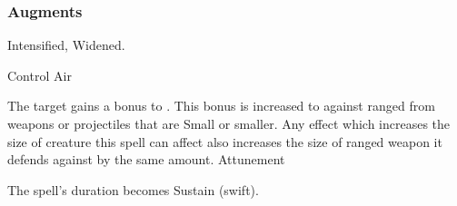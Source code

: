 \subsubsection{Augments}
 Intensified, Widened.
\begin{spellsection}{Control Air}
\begin{spellheader}
\end{spellheader}
\begin{spellcontent}
\begin{spelltargetinginfo}
\end{spelltargetinginfo}
\begin{spelleffects}
\spelleffect
The target gains a  bonus to .
This bonus is increased to  against ranged  from weapons or projectiles that are Small or smaller.
Any effect which increases the size of creature this spell can affect also increases the size of ranged weapon it defends against by the same amount.
\spelldur Attunement
\end{spelleffects}
\end{spellcontent}
\begin{spellfooter}
\miscastexplode
\end{spellfooter}
\begin{spellcantrip}
The spell's duration becomes Sustain (swift).
\end{spellcantrip}
\end{spellsection}

